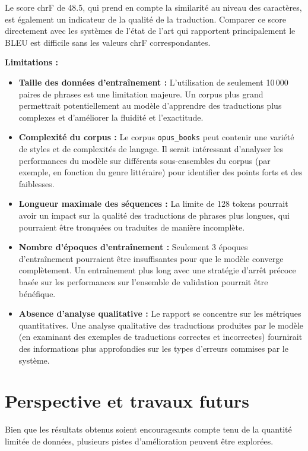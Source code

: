 \documentclass[11pt,a4paper]{article}
\begin{document}
Le score chrF de 48.5, qui prend en compte la similarité au niveau des caractères, est également un indicateur de la qualité de la traduction. Comparer ce score directement avec les systèmes de l'état de l'art qui rapportent principalement le BLEU est difficile sans les valeurs chrF correspondantes.

\textbf{Limitations :}
\begin{itemize}
\item \textbf{Taille des données d'entraînement :} L'utilisation de seulement 10\,000 paires de phrases est une limitation majeure. Un corpus plus grand permettrait potentiellement au modèle d'apprendre des traductions plus complexes et d'améliorer la fluidité et l'exactitude.
\item \textbf{Complexité du corpus :} Le corpus \texttt{opus\_books} peut contenir une variété de styles et de complexités de langage. Il serait intéressant d'analyser les performances du modèle sur différents sous-ensembles du corpus (par exemple, en fonction du genre littéraire) pour identifier des points forts et des faiblesses.
\item \textbf{Longueur maximale des séquences :} La limite de 128 tokens pourrait avoir un impact sur la qualité des traductions de phrases plus longues, qui pourraient être tronquées ou traduites de manière incomplète.
 \item \textbf{Nombre d'époques d'entraînement :} Seulement 3 époques d'entraînement pourraient être insuffisantes pour que le modèle converge complètement. Un entraînement plus long avec une stratégie d'arrêt précoce basée sur les performances sur l'ensemble de validation pourrait être bénéfique.
\item \textbf{Absence d'analyse qualitative :} Le rapport se concentre sur les métriques quantitatives. Une analyse qualitative des traductions produites par le modèle (en examinant des exemples de traductions correctes et incorrectes) fournirait des informations plus approfondies sur les types d'erreurs commises par le système.
\end{itemize}

\section{Perspective et travaux futurs}
Bien que les résultats obtenus soient encourageants compte tenu de la quantité limitée de données, plusieurs pistes d'amélioration peuvent être explorées.
\end{document}
